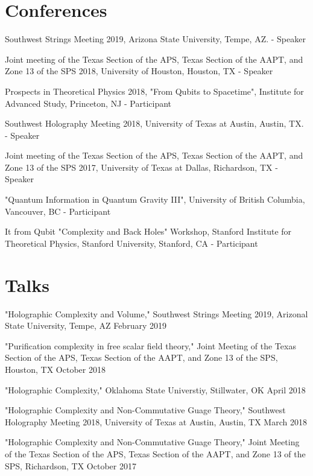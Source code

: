 \documentclass[letterpaper]{article}
\renewenvironment{itemize}{
  \begin{list}{}{
    \setlength{\leftmargin}{1.5em}
  }
}{
  \end{list}
}
\begin{document}
\section*{Conferences}
\begin{itemize}

\item Southwest Strings Meeting 2019, Arizona State University, Tempe, AZ. - Speaker

\item Joint meeting of the Texas Section of the APS, Texas Section of the AAPT, and Zone 13 of the SPS 2018, University of Houston, Houston, TX - Speaker

\item Prospects in Theoretical Physics 2018, "From Qubits to Spacetime", Institute for Advanced Study, Princeton, NJ - Participant

\item Southwest Holography Meeting 2018, University of Texas at Austin, Austin, TX. - Speaker

\item Joint meeting of the Texas Section of the APS, Texas Section of the AAPT, and Zone 13 of the SPS 2017, University of Texas at Dallas, Richardson, TX - Speaker

\item "Quantum Information in Quantum Gravity III", University of British Columbia, Vancouver, BC - Participant

\item It from Qubit "Complexity and Back Holes" Workshop, Stanford Institute for Theoretical Physics, Stanford University, Stanford, CA - Participant

\end{itemize}

\section*{Talks}
\begin{itemize}

\item "Holographic Complexity and Volume," Southwest Strings Meeting 2019, Arizonal State University, Tempe, AZ \hfill February 2019

\item "Purification complexity in free scalar field theory," Joint Meeting of the Texas Section of the APS, Texas Section of the AAPT, and Zone 13 of the SPS, Houston, TX \hfill October 2018

\item "Holographic Complexity," Oklahoma State Universtiy, Stillwater, OK \hfill April 2018

\item "Holographic Complexity and Non-Commutative Guage Theory," Southwest Holography Meeting 2018, University of Texas at Austin, Austin, TX \hfill March 2018

\item "Holographic Complexity and Non-Commutative Guage Theory," Joint Meeting of the Texas Section of the APS, Texas Section of the AAPT, and Zone 13 of the SPS, Richardson, TX \hfill October 2017

\end{itemize}
\end{document}
